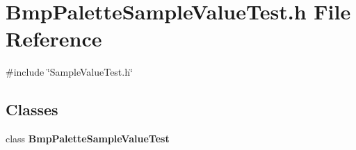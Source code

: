 \section{Bmp\+Palette\+Sample\+Value\+Test.\+h File Reference}
\label{BmpPaletteSampleValueTest_8h}
{\ttfamily \#include \char`\"{}Sample\+Value\+Test.\+h\char`\"{}}\newline
\subsection*{Classes}
\begin{DoxyCompactItemize}
\item 
class \textbf{ Bmp\+Palette\+Sample\+Value\+Test}
\end{DoxyCompactItemize}
